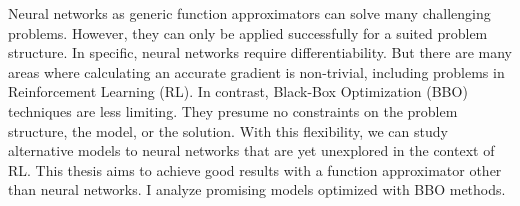 
Neural networks as generic function approximators can solve many challenging problems. However, they can only be applied successfully for a suited problem structure. In specific, neural networks require differentiability. But there are many areas where calculating an accurate gradient is non-trivial, including problems in Reinforcement Learning (RL). In contrast, Black-Box Optimization (BBO) techniques are less limiting. They presume no constraints on the problem structure, the model, or the solution. With this flexibility, we can study alternative models to neural networks that are yet unexplored in the context of RL. This thesis aims to achieve good results with a function approximator other than neural networks. I analyze promising models optimized with BBO methods.
\\
